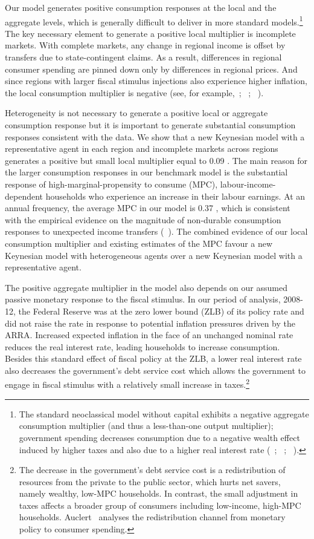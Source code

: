 \documentclass[\latexroot/\projectname]{subfiles}
\begin{document}
Our model generates positive consumption responses at the local and the aggregate levels, which is generally difficult to deliver in more standard models.\footnote{The standard neoclassical model without capital exhibits a negative aggregate consumption multiplier (and thus a less-than-one output multiplier); government spending decreases consumption due to a negative wealth effect induced by higher taxes and also due to a higher real interest rate (~\cite{Barro1984-ue}; ~\cite{Baxter1990-mo}; ~\cite{Woodford2011-jp}).} The key necessary element to generate a positive local multiplier is incomplete markets. With complete markets, any change in regional income is offset by transfers due to state-contingent claims. As a result, differences in regional consumer spending are pinned down only by differences in regional prices. And since regions with larger fiscal stimulus injections also experience higher inflation, the local consumption multiplier is negative (see, for example,~\cite{Nakamura2011-dw}; ~\cite{Farhi2012-oe}; ~\cite{Chodorow-Reich2019-zl}).

Heterogeneity is not necessary to generate a positive local or aggregate consumption response but it is important to generate substantial consumption responses consistent with the data. We show that a new Keynesian model with a representative agent in each region and incomplete markets across regions generates a positive but small local multiplier equal to 0.09 . The main reason for the larger consumption responses in our benchmark model is the substantial response of high-marginal-propensity to consume (MPC), labour-income-dependent households who experience an increase in their labour earnings. At an annual frequency, the average MPC in our model is 0.37 , which is consistent with the empirical evidence on the magnitude of non-durable consumption responses to unexpected income transfers (~\cite{Carroll2017-cp}). The combined evidence of our local consumption multiplier and existing estimates of the MPC favour a new Keynesian model with heterogeneous agents over a new Keynesian model with a representative agent.

The positive aggregate multiplier in the model also depends on our assumed passive monetary response to the fiscal stimulus. In our period of analysis, 2008-12, the Federal Reserve was at the zero lower bound (ZLB) of its policy rate and did not raise the rate in response to potential inflation pressures driven by the ARRA. Increased expected inflation in the face of an unchanged nominal rate reduces the real interest rate, leading households to increase consumption. Besides this standard effect of fiscal policy at the ZLB, a lower real interest rate also decreases the government's debt service cost which allows the government to engage in fiscal stimulus with a relatively small increase in taxes.\footnote{The decrease in the government's debt service cost is a redistribution of resources from the private to the public sector, which hurts net savers, namely wealthy, low-MPC households. In contrast, the small adjustment in taxes affects a broader group of consumers including low-income, high-MPC households. Auclert~\cite{Auclert2019-dr} analyses the redistribution channel from monetary policy to consumer spending.}
\end{document}
